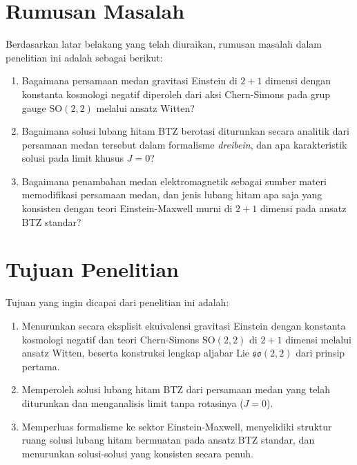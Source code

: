 \section{Rumusan Masalah}
\noindent Berdasarkan latar belakang yang telah diuraikan, rumusan masalah dalam penelitian ini adalah sebagai berikut:
\begin{enumerate}[label=\arabic*.]
    \item Bagaimana persamaan medan gravitasi Einstein di $2+1$ dimensi dengan konstanta kosmologi negatif diperoleh dari aksi Chern-Simons pada grup gauge $\mathrm{SO}(2,2)$ melalui ansatz Witten?
    \item Bagaimana solusi lubang hitam BTZ berotasi diturunkan secara analitik dari persamaan medan tersebut dalam formalisme \textit{dreibein}, dan apa karakteristik solusi pada limit khusus $J = 0$?
    \item Bagaimana penambahan medan elektromagnetik sebagai sumber materi memodifikasi persamaan medan, dan jenis lubang hitam apa saja yang konsisten dengan teori Einstein-Maxwell murni di $2+1$ dimensi pada ansatz BTZ standar?
\end{enumerate}

\section{Tujuan Penelitian}
\noindent Tujuan yang ingin dicapai dari penelitian ini adalah:
\begin{enumerate}[label=\arabic*.]
    \item Menurunkan secara eksplisit ekuivalensi gravitasi Einstein dengan konstanta kosmologi negatif dan teori Chern-Simons $\mathrm{SO}(2,2)$ di $2+1$ dimensi melalui ansatz Witten, beserta konstruksi lengkap aljabar Lie $\mathfrak{so}(2,2)$ dari prinsip pertama.
    \item Memperoleh solusi lubang hitam BTZ dari persamaan medan yang telah diturunkan dan menganalisis limit tanpa rotasinya ($J = 0$).
    \item Memperluas formalisme ke sektor Einstein-Maxwell, menyelidiki struktur ruang solusi lubang hitam bermuatan pada ansatz BTZ standar, dan menurunkan solusi-solusi yang konsisten secara penuh.
\end{enumerate}

